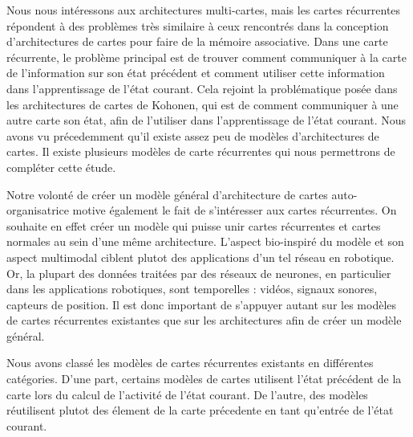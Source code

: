 Nous nous intéressons aux architectures multi-cartes, mais les cartes récurrentes répondent à des problèmes très similaire à ceux rencontrés dans la conception d'architectures de cartes pour faire de la mémoire associative. Dans une carte récurrente, le problème principal est de trouver comment communiquer à la carte de l'information sur son état précédent et comment utiliser cette information dans l'apprentissage de l'état courant. Cela rejoint la problématique posée dans les architectures de cartes de Kohonen, qui est de comment communiquer à une autre carte son état, afin de l'utiliser dans l'apprentissage de l'état courant. Nous avons vu précedemment qu'il existe assez peu de modèles d'architectures de cartes. Il existe plusieurs modèles de carte récurrentes qui nous permettrons de compléter cette étude. 

Notre volonté de créer un modèle général d'architecture de cartes auto-organisatrice motive également le fait de s'intéresser aux cartes récurrentes. On souhaite en effet créer un modèle qui puisse unir cartes récurrentes et cartes normales au sein d'une même architecture. L'aspect bio-inspiré du modèle et son aspect multimodal ciblent plutot des applications d'un tel réseau en robotique. Or, la plupart des données traitées par des réseaux de neurones, en particulier dans les applications robotiques, sont temporelles : vidéos, signaux sonores, capteurs de position. Il est donc important de s'appuyer autant sur les modèles de cartes récurrentes existantes que sur les architectures afin de créer un modèle général. 


Nous avons classé les modèles de cartes récurrentes existants en différentes catégories. D'une part, certains modèles de cartes utilisent l'état précédent de la carte lors du calcul de l'activité de l'état courant. De l'autre, des modèles réutilisent plutot des élement de la carte précedente en tant qu'entrée de l'état courant.


